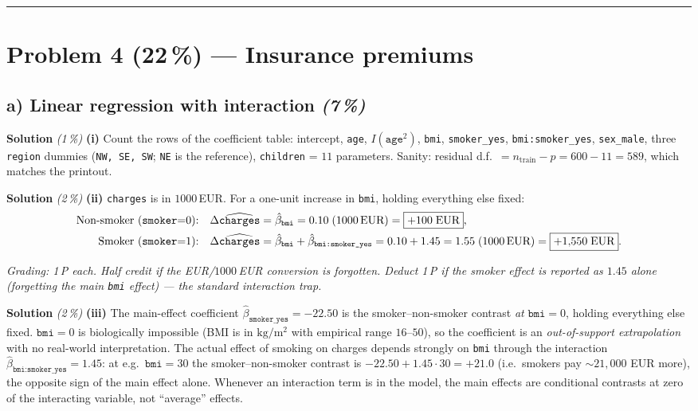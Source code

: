 \documentclass[11pt,a4paper]{article}
\newcommand{\points}[1]{\textbf{(#1\,\%)}}
\newcommand{\subpoints}[1]{\textit{(#1\,\%)}}
\newcommand{\sol}{\noindent\textbf{Solution}}
\begin{document}
\vspace{0.6em}
\hrule
\vspace{1em}

\section*{Problem 4 \points{22} --- Insurance premiums}

\subsection*{a) Linear regression with interaction \subpoints{7}}

\sol{} \subpoints{1} \textbf{(i)} Count the rows of the coefficient table: intercept,
\texttt{age}, $I(\texttt{age}^2)$, \texttt{bmi}, \texttt{smoker\_yes}, \texttt{bmi:smoker\_yes},
\texttt{sex\_male}, three \texttt{region} dummies (\texttt{NW, SE, SW}; \texttt{NE} is the
reference), \texttt{children} = $\boxed{11}$ parameters. Sanity: residual d.f.\ $= n_{\text{train}} - p
= 600 - 11 = 589$, which matches the printout. \checkmark

\medskip
\sol{} \subpoints{2} \textbf{(ii)} \texttt{charges} is in $1000$\,EUR. For a one-unit increase
in \texttt{bmi}, holding everything else fixed:
\begin{align*}
\text{Non-smoker (\texttt{smoker}=0):}\quad
   \Delta\widehat{\texttt{charges}} &= \hat\beta_{\texttt{bmi}} = 0.10 \;(1000\,\text{EUR})
   = \boxed{+100\;\text{EUR}}, \\
\text{Smoker (\texttt{smoker}=1):}\quad
   \Delta\widehat{\texttt{charges}} &= \hat\beta_{\texttt{bmi}}+\hat\beta_{\texttt{bmi:smoker\_yes}}
   = 0.10 + 1.45 = 1.55 \;(1000\,\text{EUR})
   = \boxed{+1{,}550\;\text{EUR}}.
\end{align*}

\noindent\emph{Grading: 1\,P each. Half credit if the EUR/$1000$\,EUR conversion is forgotten.
Deduct 1\,P if the smoker effect is reported as $1.45$ alone (forgetting the main \texttt{bmi}
effect) --- the standard interaction trap.}

\medskip
\sol{} \subpoints{2} \textbf{(iii)} The main-effect coefficient $\hat\beta_{\texttt{smoker\_yes}}=-22.50$
is the smoker--non-smoker contrast \emph{at} $\texttt{bmi}=0$, holding everything else fixed.
$\texttt{bmi}=0$ is biologically impossible (BMI is in $\mathrm{kg}/\mathrm{m}^2$ with empirical
range $16$--$50$), so the coefficient is an \emph{out-of-support extrapolation} with no
real-world interpretation. The actual effect of smoking on charges depends strongly on \texttt{bmi}
through the interaction $\hat\beta_{\texttt{bmi:smoker\_yes}}=1.45$: at e.g.\ $\texttt{bmi}=30$ the
smoker--non-smoker contrast is $-22.50 + 1.45\cdot 30 = +21.0$ (i.e.\ smokers pay $\sim 21{,}000$
EUR more), the opposite sign of the main effect alone. Whenever an interaction term is in the
model, the main effects are conditional contrasts at zero of the interacting variable, not
``average'' effects.
\end{document}

